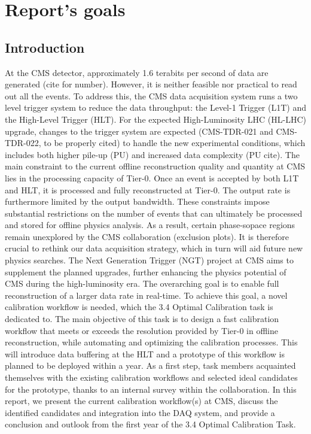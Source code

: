 \chapter{Report's goals}

\section{Introduction}
At the CMS detector, approximately 1.6 terabits per second of data are generated (cite for number). However, it is neither feasible nor practical to read out all the events. To address this, the CMS data acquisition system runs a two level trigger system to reduce the data throughput: the Level-1 Trigger (L1T) and the High-Level Trigger (HLT). For the expected High-Luminosity LHC (HL-LHC) upgrade, changes to the trigger system are expected (CMS-TDR-021 and CMS-TDR-022, to be properly cited) to handle the new experimental conditions, which includes both higher pile-up (PU) and increased data complexity (PU cite). 
\newline \newline 
The main constraint to the current offline reconstruction quality and quantity at CMS lies in the processing capacity of Tier-0. Once an event is accepted by both L1T and HLT, it is processed and fully reconstructed at Tier-0. The output rate is furthermore limited by the output bandwidth. These constraints impose substantial restrictions on the number of events that can ultimately be processed and stored for offline physics analysis. As a result, certain phase-sopace regions remain unexplored by the CMS collaboration (exclusion plots). 
It is therefore crucial to rethink our data acquisition strategy, which in turn will aid future new physics searches. The Next Generation Trigger (NGT) project at CMS aims to supplement the planned upgrades, further enhancing the physics potential of CMS during the high-luminosity era. The overarching goal is to enable full reconstruction of a larger data rate in real-time.
\newline \newline
To achieve this goal, a novel calibration workflow is needed, which the 3.4 Optimal Calibration task is dedicated to. The main objective of this task is to design a fast calibration workflow that meets or exceeds the resolution provided by Tier-0 in offline reconstruction, while automating and optimizing the calibration processes. This will introduce data buffering at the HLT and a prototype of this workflow is planned to be deployed within a year. As a first step, task members acquainted themselves with the existing calibration workflows and selected ideal candidates for the prototype, thanks to an internal survey within the collaboration. In this report, we present the current calibration workflow(s) at CMS, discuss the identified candidates and integration into the DAQ system, and provide a conclusion and outlook from the first year of the 3.4 Optimal Calibration Task.



